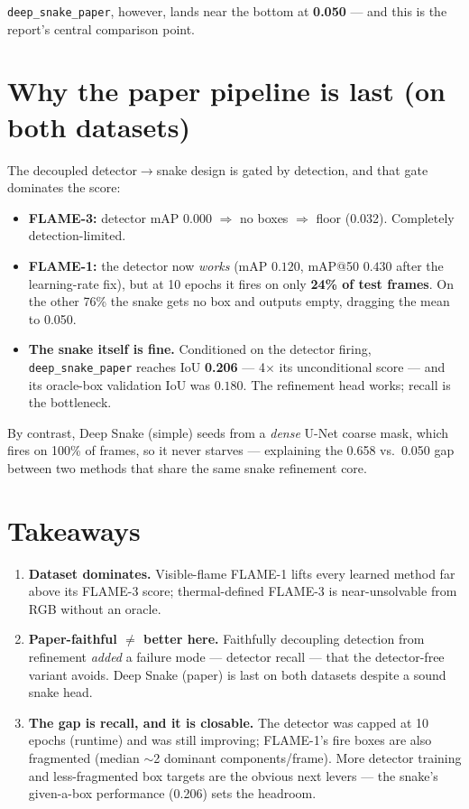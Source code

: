 \documentclass[10pt]{article}
\begin{document}
\texttt{deep\_snake\_paper}, however, lands near the bottom at \textbf{0.050} --- and
this is the report's central comparison point.

\section{Why the paper pipeline is last (on both datasets)}

The decoupled detector$\to$snake design is gated by detection, and that gate
dominates the score:

\begin{itemize}
\item \textbf{FLAME-3:} detector mAP $0.000$ $\Rightarrow$ no boxes $\Rightarrow$ floor
  (0.032). Completely detection-limited.
\item \textbf{FLAME-1:} the detector now \emph{works} (mAP $0.120$, mAP@50
  $\mathbf{0.430}$ after the learning-rate fix), but at 10 epochs it fires on only
  \textbf{24\% of test frames}. On the other 76\% the snake gets no box and outputs
  empty, dragging the mean to 0.050.
\item \textbf{The snake itself is fine.} Conditioned on the detector firing,
  \texttt{deep\_snake\_paper} reaches IoU \textbf{0.206} --- 4$\times$ its
  unconditional score --- and its oracle-box validation IoU was $0.180$. The
  refinement head works; recall is the bottleneck.
\end{itemize}

By contrast, Deep Snake (simple) seeds from a \emph{dense} U-Net coarse mask, which
fires on 100\% of frames, so it never starves --- explaining the 0.658 vs.\ 0.050
gap between two methods that share the same snake refinement core.

\section{Takeaways}

\begin{enumerate}
\item \textbf{Dataset dominates.} Visible-flame FLAME-1 lifts every learned method
  far above its FLAME-3 score; thermal-defined FLAME-3 is near-unsolvable from RGB
  without an oracle.
\item \textbf{Paper-faithful $\neq$ better here.} Faithfully decoupling detection
  from refinement \emph{added} a failure mode --- detector recall --- that the
  detector-free variant avoids. Deep Snake (paper) is last on both datasets despite
  a sound snake head.
\item \textbf{The gap is recall, and it is closable.} The detector was capped at 10
  epochs (runtime) and was still improving; FLAME-1's fire boxes are also fragmented
  (median $\sim$2 dominant components/frame). More detector training and
  less-fragmented box targets are the obvious next levers --- the snake's
  given-a-box performance (0.206) sets the headroom.
\end{enumerate}
\end{document}
